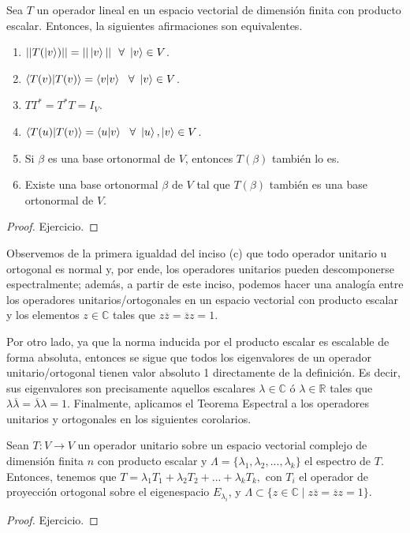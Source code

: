 \documentclass[12pt,dvipsnames]{article}
\newenvironment{teorema}[2][Teorema]{\begin{trivlist}
\item[\hskip \labelsep {\bfseries #1}\hskip \labelsep {\bfseries #2.}]}{\end{trivlist}}
\newenvironment{corolario}[2][Corolario]{\begin{trivlist}
\item[\hskip \labelsep {\bfseries #1}\hskip \labelsep {\bfseries #2.}]}{\end{trivlist}}
\begin{document}
\begin{teorema} {16.2}
    Sea $T$ un operador lineal en un espacio vectorial de dimensión finita con producto escalar. Entonces, la siguientes afirmaciones son equivalentes.

    \begin{enumerate}[label=(\alph*)]
        \item $||T(\ket{v})|| = || \ket{v} || \ \ \forall \ \ket{v}\in V$.
        \item $\braket{T(v)|T(v)} = \braket{v|v} \ \ \forall \ \ket{v}\in V$.
        \item $TT^*=T^*T=I_V$.
        \item $\braket{T(u)|T(v)} = \braket{u|v} \ \ \forall \ \ket{u},\ket{v}\in V$.
        \item Si $\beta$ es una base ortonormal de $V$, entonces $T(\beta)$ también lo es.
        \item Existe una base ortonormal $\beta$ de $V$ tal que $T(\beta)$ también es una base ortonormal de $V$.
    \end{enumerate}
\end{teorema}

\begin{proof}
    Ejercicio.
\end{proof}

Observemos de la primera igualdad del inciso (c) que todo operador unitario u ortogonal es normal y, por ende, los operadores unitarios pueden descomponerse espectralmente; además, a partir de este inciso, podemos hacer una analogía entre los operadores unitarios/ortogonales en un espacio vectorial con producto escalar y los elementos $z\in \mathbb{C}$ tales que $z \overline{z} = \overline{z} z = 1$.

\vspace{3mm}
Por otro lado, ya que la norma inducida por el producto escalar es escalable de forma absoluta, entonces se sigue que todos los eigenvalores de un operador unitario/ortogonal tienen valor absoluto 1 directamente de la definición. Es decir, sus eigenvalores son precisamente aquellos escalares $\lambda\in\mathbb{C}$ ó $\lambda\in\mathbb{R}$ tales que $\lambda \overline{\lambda} = \overline{\lambda} \lambda = 1$. Finalmente, aplicamos el Teorema Espectral a los operadores unitarios y ortogonales en los siguientes corolarios.

\begin{corolario} {16.3}
    Sean $T:V\to V$ un operador unitario sobre un espacio vectorial complejo de dimensión finita $n$ con producto escalar y $\Lambda=\{\lambda_1,\lambda_2,... , \lambda_k\}$ el espectro de $T$. Entonces, tenemos que $T = \lambda_1 T_1 + \lambda_2 T_2 + ... + \lambda_k T_k,$ con $T_i$ el operador de proyección ortogonal sobre el eigenespacio $E_{\lambda_i}$, y $\Lambda\subset\{z\in \mathbb{C} \mid z \overline{z}= \overline{z}z = 1\}$.

    \begin{proof}
        Ejercicio.
    \end{proof}
       
\end{corolario}
\end{document}

